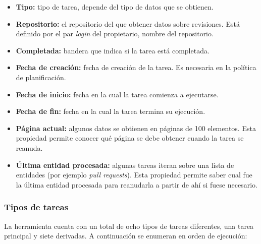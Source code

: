 \begin{itemize}
\tightlist
	\item \textbf{Tipo:} tipo de tarea, depende del tipo de datos que se obtienen.
	\item \textbf{Repositorio:} el repositorio del que obtener datos sobre revisiones. Está definido por el par \textit{login} del propietario, nombre del repositorio.
	\item \textbf{Completada:} bandera que indica si la tarea está completada.
	\item \textbf{Fecha de creación:} fecha de creación de la tarea. Es necesaria en la política de planificación.
	\item \textbf{Fecha de inicio:} fecha en la cual la tarea comienza a ejecutarse.
	\item \textbf{Fecha de fin:} fecha en la cual la tarea termina su ejecución.
	\item \textbf{Página actual:} algunos datos se obtienen en páginas de 100 elementos. Esta propiedad permite conocer qué página se debe obtener cuando la tarea se reanuda.
	\item \textbf{Última entidad procesada:} algunas tareas iteran sobre una lista de entidades (por ejemplo \textit{pull requests}). Esta propiedad permite saber cual fue la última entidad procesada para reanudarla a partir de ahí si fuese necesario.
\end{itemize}

\subsubsection{Tipos de tareas}

La herramienta cuenta con un total de ocho tipos de tareas diferentes, una tarea principal y siete derivadas. A continuación se enumeran en orden de ejecución:

